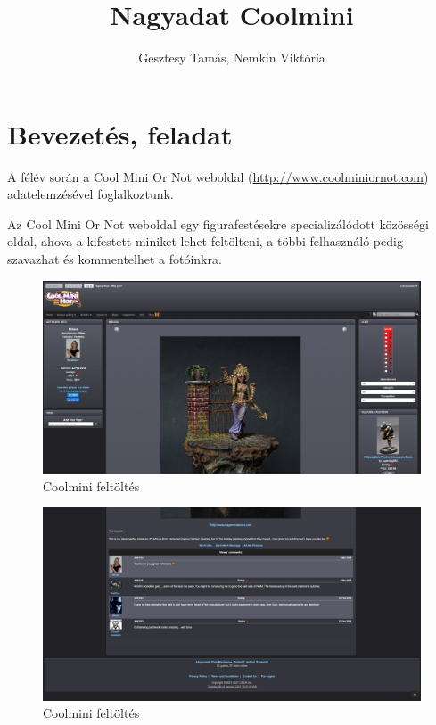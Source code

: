 \documentclass[14pt,a4paper]{article}
\title{Nagyadat Coolmini}
\author{Gesztesy Tamás, Nemkin Viktória}
\date{}
\begin{document}
\maketitle

\section{Bevezetés, feladat}

A félév során a Cool Mini Or Not weboldal (\url{http://www.coolminiornot.com}) adatelemzésével foglalkoztunk.

Az Cool Mini Or Not weboldal egy figurafestésekre specializálódott közösségi oldal, ahova a kifestett miniket
lehet feltölteni, a többi felhasználó pedig szavazhat és kommentelhet a fotóinkra.

\begin{figure}[H]
\centering
\includegraphics[width=1.0\columnwidth]{pics/page_submission.png}
\caption{Coolmini feltöltés}
\end{figure}

\begin{figure}[H]
\centering
\includegraphics[width=1.0\columnwidth]{pics/page_comments.png}
\caption{Coolmini feltöltés}
\end{figure}
\end{document}
